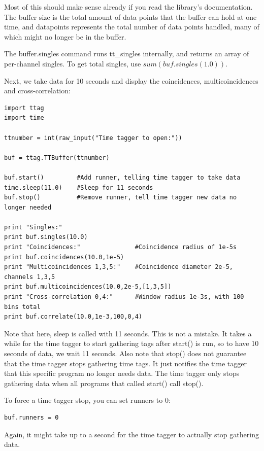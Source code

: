 \documentclass[10pt]{article}
\begin{document}
Most of this should make sense already if you read the library's documentation. The buffer size is the total amount of data points that the buffer can hold at one time,
and datapoints represents the total number of data points handled, many of which might no longer be in the buffer. 

The buffer.singles command runs tt\_singles internally, and returns an array of per-channel singles. To get total singles, use $sum(buf.singles(1.0))$.

Next, we take data for 10 seconds and display the coincidences, multicoincidences and cross-correlation:

\begin{verbatim}
import ttag
import time

ttnumber = int(raw_input("Time tagger to open:"))

buf = ttag.TTBuffer(ttnumber)

buf.start()         #Add runner, telling time tagger to take data
time.sleep(11.0)    #Sleep for 11 seconds
buf.stop()          #Remove runner, tell time tagger new data no longer needed

print "Singles:"
print buf.singles(10.0)
print "Coincidences:"               #Coincidence radius of 1e-5s
print buf.coincidences(10.0,1e-5)
print "Multicoincidences 1,3,5:"    #Coincidence diameter 2e-5, channels 1,3,5
print buf.multicoincidences(10.0,2e-5,[1,3,5])
print "Cross-correlation 0,4:"      #Window radius 1e-3s, with 100 bins total
print buf.correlate(10.0,1e-3,100,0,4)

\end{verbatim}

Note that here, sleep is called with 11 seconds. This is not a mistake. It takes a while for the time tagger to start gathering tags after start() is run, so
to have 10 seconds of data, we wait 11 seconds. Also note that stop() does not guarantee that the time tagger stops gathering time tags. It just notifies the
time tagger that this specific program no longer needs data. The time tagger only stops gathering data when all programs that called start() call stop().

To force a time tagger stop, you can set runners to 0:

\begin{verbatim}
buf.runners = 0
\end{verbatim}

Again, it might take up to a second for the time tagger to actually stop gathering data.
\end{document}
